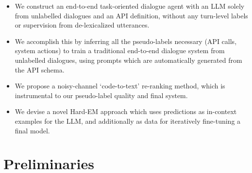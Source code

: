 \documentclass[11pt]{article}
\newcommand{\bdk}[1]{}
\newcommand{\jmf}[1]{}
\begin{document}
\begin{itemize}
    \item We construct an end-to-end task-oriented dialogue agent with an LLM solely from unlabelled dialogues and an API definition, without any turn-level labels or supervision from de-lexicalized utterances.
    \item We accomplish this by inferring all the pseudo-labels necessary (API calls, system actions) to train a traditional end-to-end dialogue system from unlabelled dialogues, using prompts which are automatically generated from the API schema.
    \item We propose a noisy-channel `code-to-text' re-ranking method, which is instrumental to our pseudo-label quality and final system.
    \item We devise a novel Hard-EM \cite{dempster_maximum_1977_fixed}\jmf{fix for camera-ready} approach which uses predictions as in-context examples for the LLM, and additionally as data for iteratively fine-tuning a final model.
    
\end{itemize}

\section{Preliminaries}
\end{document}
